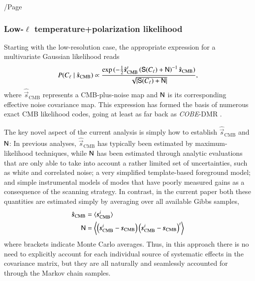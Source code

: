 /Page\documentclass[twocolumn]{aa}
\newcommand{\s}[0]{\vec{s}}
\newcommand{\N}[0]{\tens{N}}
\renewcommand{\S}[0]{\tens{S}}
\begin{document}
\subsubsection{Low-$\ell$ temperature+polarization likelihood}

Starting with the low-resolution case, the appropriate expression for
a multivariate Gaussian likelihood reads
\begin{equation}
  \label{eq:gauss_like}
  P(C_\ell\mid\hat{\s}_{\mathrm{CMB}}) \propto \frac{\exp{(-\frac{1}{2}\hat{\s}_{\mathrm{CMB}}^t
  \left( \S(C_\ell)+\N \right)^{-1}\hat{\s}_{\mathrm{CMB}}})}{\sqrt{|\S(C_\ell)+\N|}},
\end{equation}
where $\hat{\s}_{\mathrm{CMB}}$ represents a CMB-plus-noise map and
$\N$ is its corresponding effective noise covariance map. This
expression has formed the basis of numerous exact CMB likelihood
codes, going at least as far back as \emph{COBE}-DMR
\citep[e.g.,][]{gorski:1994}.

The key novel aspect of the current analysis is simply how to
establish $\hat{\s}_{\mathrm{CMB}}$ and $\N$: In previous analyses,
$\hat{\s}_{\mathrm{CMB}}$ has typically been estimated by
maximum-likelihood techniques, while $\N$ has been estimated through
analytic evaluations that are only able to take into account a rather
limited set of uncertainties, such as white and correlated noise; a
very simplified template-based foreground model; and simple
instrumental models of modes that have poorly measured gains as a consequence 
of the scanning strategy. In contrast, in the current paper both these
quantities are estimated simply by averaging over all available Gibbs
samples,
\begin{align}
  \hat{\s}_{\mathrm{CMB}} &= \langle\s^i_{\mathrm{CMB}}\rangle \\
  \N &= \left\langle\left( \s^i_{\mathrm{CMB}}-\s_{\mathrm{CMB}} \right)
  \left( \s^i_{\mathrm{CMB}}-\s_{\mathrm{CMB}} \right)^t\right\rangle
  \label{eq:postmean}
\end{align}
where brackets indicate Monte Carlo averages. Thus, in this approach
there is no need to explicitly account for each individual source of
systematic effects in the covariance matrix, but they are all
naturally and seamlessly accounted for through the Markov chain
samples.
\end{document}
